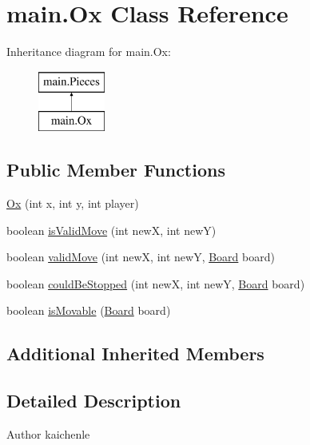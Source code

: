 \hypertarget{classmain_1_1_ox}{}\section{main.\+Ox Class Reference}
\label{classmain_1_1_ox}
Inheritance diagram for main.\+Ox\+:\begin{figure}[H]
\begin{center}
\leavevmode
\includegraphics[height=2.000000cm]{classmain_1_1_ox}
\end{center}
\end{figure}
\subsection*{Public Member Functions}
\begin{DoxyCompactItemize}
\item 
\mbox{\hyperlink{classmain_1_1_ox_a1c423374c91b4af6701379f626507147}{Ox}} (int x, int y, int player)
\item 
boolean \mbox{\hyperlink{classmain_1_1_ox_aedafaea098b12d2a492cd2699510c62e}{is\+Valid\+Move}} (int newX, int newY)
\item 
boolean \mbox{\hyperlink{classmain_1_1_ox_a3963f0e93e390fe6a509a6a4da42f975}{valid\+Move}} (int newX, int newY, \mbox{\hyperlink{classmain_1_1_board}{Board}} board)
\item 
boolean \mbox{\hyperlink{classmain_1_1_ox_a73722f234f1025002c7d3a6c3613d126}{could\+Be\+Stopped}} (int newX, int newY, \mbox{\hyperlink{classmain_1_1_board}{Board}} board)
\item 
boolean \mbox{\hyperlink{classmain_1_1_ox_a29651061f20b6ca13c8a351e6121159f}{is\+Movable}} (\mbox{\hyperlink{classmain_1_1_board}{Board}} board)
\end{DoxyCompactItemize}
\subsection*{Additional Inherited Members}


\subsection{Detailed Description}
\begin{DoxyAuthor}{Author}
kaichenle 
\end{DoxyAuthor}


